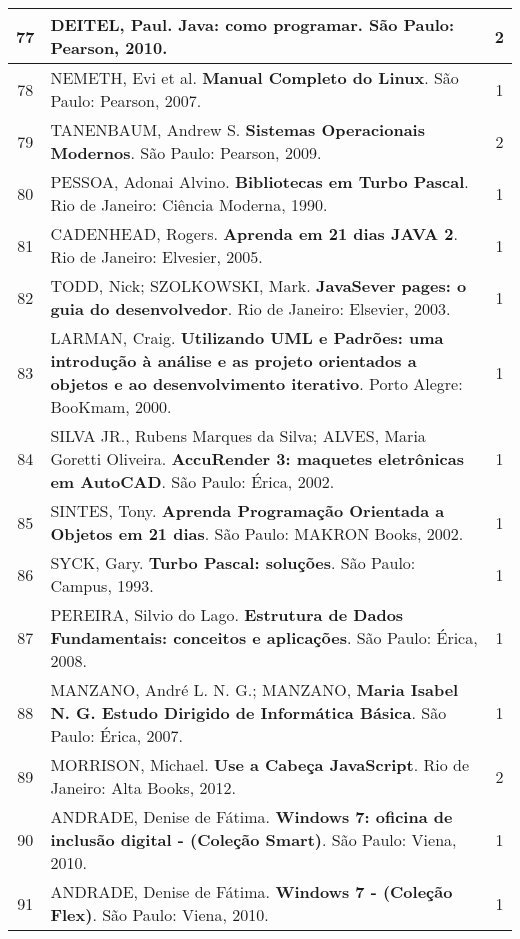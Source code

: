 \begin{longtable}{|c|p{115mm}|c|}
77     & DEITEL, Paul. \textbf{Java: como programar}. São Paulo: Pearson, 2010.                & 2          \\ \hline
78     & NEMETH, Evi et al. \textbf{Manual Completo do Linux}. São Paulo: Pearson, 2007.       & 1          \\ \hline
79     & TANENBAUM, Andrew S. \textbf{Sistemas Operacionais Modernos}. São Paulo: Pearson, 2009.        & 2          \\ \hline
80     & PESSOA, Adonai Alvino. \textbf{Bibliotecas em Turbo Pascal}. Rio de Janeiro: Ciência Moderna, 1990. & 1          \\ \hline
81     & CADENHEAD, Rogers. \textbf{Aprenda em 21 dias JAVA 2}. Rio de Janeiro: Elvesier, 2005.& 1          \\ \hline
82     & TODD, Nick; SZOLKOWSKI, Mark. \textbf{JavaSever pages: o guia do desenvolvedor}. Rio de Janeiro: Elsevier, 2003. & 1          \\ \hline
83     & LARMAN, Craig. \textbf{Utilizando UML e Padrões: uma introdução à análise e as projeto orientados a objetos e ao desenvolvimento iterativo}. Porto Alegre: BooKmam, 2000. & 1          \\ \hline
84     & SILVA JR., Rubens Marques da Silva; ALVES, Maria Goretti Oliveira. \textbf{AccuRender 3: maquetes eletrônicas em AutoCAD}. São Paulo: Érica, 2002. & 1          \\ \hline
85     & SINTES, Tony. \textbf{Aprenda Programação Orientada a Objetos em 21 dias}. São Paulo: MAKRON Books, 2002. & 1          \\ \hline
86     & SYCK, Gary. \textbf{Turbo Pascal: soluções}. São Paulo: Campus, 1993.                          & 1          \\ \hline
87     & PEREIRA, Silvio do Lago. \textbf{Estrutura de Dados Fundamentais: conceitos e aplicações}. São Paulo: Érica, 2008. & 1          \\ \hline
88     & MANZANO, André L. N. G.; MANZANO, \textbf{Maria Isabel N. G. Estudo Dirigido de Informática Básica}. São Paulo: Érica, 2007. & 1          \\ \hline
89     & MORRISON, Michael. \textbf{Use a Cabeça JavaScript}. Rio de Janeiro: Alta Books, 2012.         & 2          \\ \hline
90     & ANDRADE, Denise de Fátima. \textbf{Windows 7: oficina de inclusão digital - (Coleção Smart)}. São Paulo: Viena, 2010. & 1          \\ \hline
91     & ANDRADE, Denise de Fátima. \textbf{Windows 7 - (Coleção Flex)}. São Paulo: Viena, 2010.                 & 1          \\ \hline
\end{longtable}


